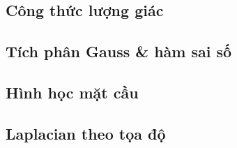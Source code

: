 ﻿\subsection*{Công thức lượng giác}
\begin{ctbox}\end{ctbox}

\bigskip

\subsection*{Tích phân Gauss \& hàm sai số}
\begin{ctbox}\end{ctbox}

\smallskip

\begin{ctbox}\end{ctbox}

\smallskip

\begin{ctbox}\end{ctbox}

\smallskip

\begin{ctbox}\end{ctbox}

\bigskip

\subsection*{Hình học mặt cầu}
\begin{ctbox}\end{ctbox}

\smallskip

\begin{ctbox}\end{ctbox}

\bigskip

\subsection*{Laplacian theo tọa độ}
\begin{ctbox}\end{ctbox}

